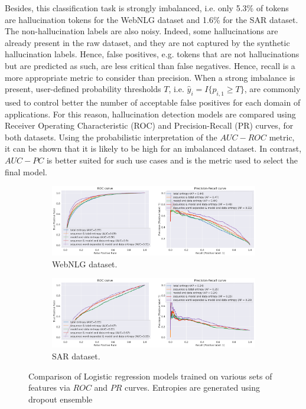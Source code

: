 Besides, this classification task is strongly imbalanced, i.e. only 5.3\% of tokens are hallucination tokens for the WebNLG dataset and 1.6\% for the SAR dataset. The non-hallucination labels are also noisy. Indeed, some hallucinations are already present in the raw dataset, and they are not captured by the synthetic hallucination labels. Hence, false positives, e.g.  tokens that are not hallucinations but are predicted as such, are less critical than false negatives. Hence, recall is a more appropriate metric to consider than precision. When a strong imbalance is present, user-defined probability thresholds $T$, i.e. $\hat y_i = I\{p_{i,1} \geq T\}$, are commonly used to control better the number of acceptable false positives for each domain of applications.
For this reason, hallucination detection models are compared using Receiver Operating Characteristic (ROC) and Precision-Recall (PR) curves, for both datasets. Using the probabilistic interpretation of the $AUC-ROC$ metric, it can be shown that it is likely to be high for an imbalanced dataset. In contrast, $AUC-PC$ is better suited for such use cases and is the metric used to select the final model. 

\begin{figure}
     \centering
     \begin{subfigure}[b]{0.95\textwidth}
         \centering
         \includegraphics[width=\textwidth]{figures/eval/entropy_pred_power/WebNLG_dropout_ensemble.png}
         \caption{WebNLG dataset.}
         \label{fig:webnlg-local-ensemble-hallu-detection}
     \end{subfigure}
     \hfill
    \begin{subfigure}[b]{0.95\textwidth}
         \centering
         \includegraphics[width=\textwidth]{figures/eval/entropy_pred_power/SAR_hallu_dropout_results.png}
         \caption{SAR dataset.}
         \label{fig:sar-local-ensemble-hallu-detection}
     \end{subfigure}
     \hfill
     \hfill
       \caption{Comparison of Logistic regression models trained on various sets of features via $ROC$ and $PR$ curves. Entropies are generated using dropout ensemble}
        \label{fig:local-ensemble-hallu-detection}
\end{figure}


